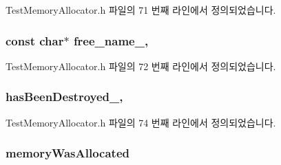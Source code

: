 Test\+Memory\+Allocator.\+h 파일의 71 번째 라인에서 정의되었습니다.

\subsubsection[{\texorpdfstring{free\+\_\+name\+\_\+}{free_name_}}]{\setlength{\rightskip}{0pt plus 5cm}const char$\ast$ free\+\_\+name\+\_\+\hspace{0.3cm}{\ttfamily [protected]}, {\ttfamily [inherited]}}\hypertarget{class_test_memory_allocator_a4f7ece205625129df190e624cccf9286}{}\label{class_test_memory_allocator_a4f7ece205625129df190e624cccf9286}


Test\+Memory\+Allocator.\+h 파일의 72 번째 라인에서 정의되었습니다.

\subsubsection[{\texorpdfstring{has\+Been\+Destroyed\+\_\+}{hasBeenDestroyed_}}]{ has\+Been\+Destroyed\+\_\+\hspace{0.3cm}{\ttfamily [protected]}, {\ttfamily [inherited]}}\hypertarget{class_test_memory_allocator_a971604f223534e64d5024d63396b397a}{}\label{class_test_memory_allocator_a971604f223534e64d5024d63396b397a}


Test\+Memory\+Allocator.\+h 파일의 74 번째 라인에서 정의되었습니다.

\subsubsection[{\texorpdfstring{memory\+Was\+Allocated}{memoryWasAllocated}}]{ memory\+Was\+Allocated}\hypertarget{class_my_own_string_allocator_a7a574464061cfafa61c1cbf5095b5ab4}{}\label{class_my_own_string_allocator_a7a574464061cfafa61c1cbf5095b5ab4}



